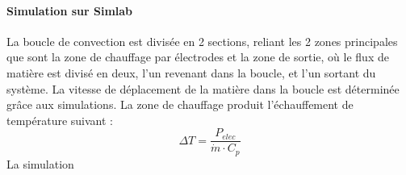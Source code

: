 \documentclass[12pt, a4paper, french, BCOR = 0pt, DIV = 10]{scrartcl}
\begin{document}
     \paragraph{Simulation sur Simlab}
     La boucle de convection est divisée en 2 sections, reliant les 2 zones principales que sont la zone de chauffage par électrodes et la zone de sortie, où le flux de matière est divisé en deux, l'un revenant dans la boucle, et l'un sortant du système. La vitesse de déplacement de la matière dans la boucle est déterminée grâce aux simulations. La zone de chauffage produit l'échauffement de température suivant :
     $$\Delta T = \frac{P_{elec}}{\dot{m}\cdot C_p}$$
     La simulation 
\end{document}
